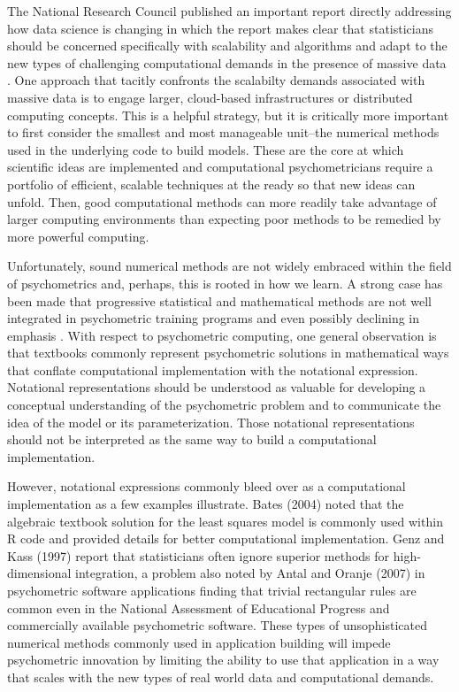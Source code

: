 \documentclass[12pt]{article}
\begin{document}
The National Research Council published an important report directly addressing how data science is changing in which the report makes clear that statisticians should be concerned specifically with scalability and algorithms and adapt to the new types of challenging computational demands in the presence of massive data \cite{massive}. One approach that tacitly confronts the scalabilty demands associated with massive data is to engage larger, cloud-based infrastructures or distributed computing concepts. This is a helpful strategy, but it is critically more important to first consider the smallest and most manageable unit--the numerical methods used in the underlying code to build models. These are the core at which scientific ideas are implemented and computational psychometricians require a portfolio of efficient, scalable techniques at the ready so that new ideas can unfold. Then, good computational methods can more readily take advantage of larger computing environments than expecting poor methods to be remedied by more powerful computing.   

Unfortunately, sound numerical methods are not widely embraced within the field of psychometrics and, perhaps, this is rooted in how we learn. A strong case has been made that progressive statistical and mathematical methods are not well integrated in psychometric training programs and even possibly declining in emphasis \cite{aiken,townsend}. With respect to psychometric computing, one general observation is that textbooks commonly represent psychometric solutions in mathematical ways that conflate computational implementation with the notational expression. Notational representations should be understood as valuable for developing a conceptual understanding of the psychometric problem and to communicate the idea of the model or its parameterization. Those notational representations should not be interpreted as the same way to build a computational implementation. 

However, notational expressions commonly bleed over as a computational implementation as a few examples illustrate. Bates (2004)\nocite{Rnews:Bates:2004} noted that the algebraic textbook solution for the least squares model is commonly used within R code and provided details for better computational implementation. Genz and Kass (1997) report that statisticians often ignore superior methods for high-dimensional integration, a problem also noted by Antal and Oranje (2007) in psychometric software applications finding that trivial rectangular rules are common even in the National Assessment of Educational Progress \cite{nces} and commercially available psychometric software. These types of unsophisticated numerical methods commonly used in application building will impede psychometric innovation by limiting the ability to use that application in a way that scales with the new types of real world data and computational demands. \nocite{genz, ets:2007}
\end{document}
